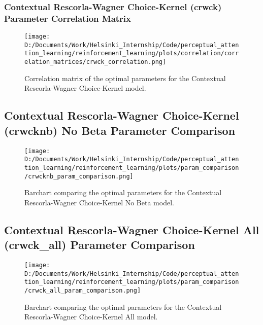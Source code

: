 \documentclass[12pt]{article}
\newcommand{\correlation}{0.25}
\newcommand{\parameter}{0.35}
\begin{document}
\subsubsection{Contextual Rescorla-Wagner Choice-Kernel (crwck) Parameter Correlation Matrix}

\begin{figure}[h]  %
	\centering
	\texttt{[image: D:/Documents/Work/Helsinki\_Internship/Code/perceptual\_attention\_learning/reinforcement\_learning/plots/correlation/correlation\_matrices/crwck\_correlation.png]}  %
	\caption{Correlation matrix of the optimal parameters for the Contextual Rescorla-Wagner Choice-Kernel model.}
	\label{fig:crwck_correlation_matrix}
\end{figure} 
\clearpage
\newpage
\subsection{Contextual Rescorla-Wagner Choice-Kernel (crwcknb) No Beta Parameter Comparison}

\begin{figure}[h]  %
	\centering
	\texttt{[image: D:/Documents/Work/Helsinki\_Internship/Code/perceptual\_attention\_learning/reinforcement\_learning/plots/param\_comparison/crwcknb\_param\_comparison.png]}  %
	\caption{Barchart comparing the optimal parameters for the Contextual Rescorla-Wagner Choice-Kernel No Beta model.}
	\label{fig:crwcknb_model_parmeters}
\end{figure} 

\clearpage

\subsection{Contextual Rescorla-Wagner Choice-Kernel All (crwck\_all) Parameter Comparison}

\begin{figure}[h]  %
	\centering
	\texttt{[image: D:/Documents/Work/Helsinki\_Internship/Code/perceptual\_attention\_learning/reinforcement\_learning/plots/param\_comparison/crwck\_all\_param\_comparison.png]}  %
	\caption{Barchart comparing the optimal parameters for the Contextual Rescorla-Wagner Choice-Kernel All model.}
	\label{fig:crwck_all_model_parmeters}
\end{figure} 
\newpage
\end{document}

